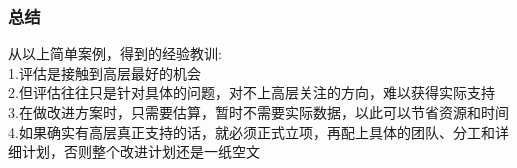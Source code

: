 \hypertarget{ux603bux7ed3}{%
\subsubsection{总结}\label{ux603bux7ed3}}

从以上简单案例，得到的经验教训:\\
1.评估是接触到高层最好的机会\\
2.但评估往往只是针对具体的问题，对不上高层关注的方向，难以获得实际支持\\
3.在做改进方案时，只需要估算，暂时不需要实际数据，以此可以节省资源和时间\\
4.如果确实有高层真正支持的话，就必须正式立项，再配上具体的团队、分工和详细计划，否则整个改进计划还是一纸空文\\



